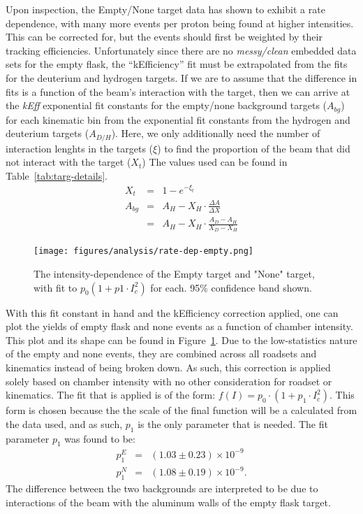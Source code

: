 Upon inspection, the Empty/None target data has shown to exhibit a rate dependence, with many more events per proton being found at higher intensities. This can be corrected for, but the events should first be weighted by their tracking efficiencies. Unfortunately since there are no \emph{messy/clean} embedded data sets for the empty flask, the ``kEfficiency'' fit must be extrapolated from the fits for the deuterium and hydrogen targets. If we are to assume that the difference in fits is a function of the beam's interaction with the target, then we can arrive at the \emph{kEff} exponential fit constants for the empty/none background targets ($A_{bg}$) for each kinematic bin from the exponential fit constants from the hydrogen and deuterium targets ($A_{D/H}$). Here, we only additionally need the number of interaction lenghts in the targets ($\xi$) to find the proportion of the beam that did not interact with the target ($X_t$) The values used can be found in Table~\ref{tab:targ-details}.
\begin{eqnarray}
X_t & = & 1 - e^{-\xi_t} \\
A_{bg} & = & A_H - X_H \cdot \frac{\Delta A}{\Delta X} \\
	   & = & A_H - X_H \cdot \frac{A_D - A_H}{X_D - X_H}
\end{eqnarray}

\begin{figure}
	\centering
	\texttt{[image: figures/analysis/rate-dep-empty.png]}
	\caption{The intensity-dependence of the Empty target and "None" target, with fit to $p_0 (1+p1\cdot I_c^2)$ for each. 95\% confidence band shown.}
	\label{fig:empty-rate-dep}
\end{figure}
With this fit constant in hand and the kEfficiency correction applied, one can plot the yields of empty flask and none events as a function of chamber intensity. This plot and its shape can be found in Figure~\ref{fig:empty-rate-dep}. Due to the low-statistics nature of the empty and none events, they are combined across all roadsets and kinematics instead of being broken down. As such, this correction is applied solely based on chamber intensity with no other consideration for roadset or kinematics. The fit that is applied is of the form: $f(I) = p_0 \cdot (1 + p_1 \cdot I_c^2)$. This form is chosen because the the scale of the final function will be a calculated from the data used, and as such, $p_1$ is the only parameter that is needed. The fit parameter $p_1$ was found to be:
\begin{eqnarray}
p^E_1 & = & (1.03 \pm 0.23) \times 10^{-9} \\
p^N_1 & = & (1.08 \pm 0.19) \times 10^{-9}.
\end{eqnarray}
The difference between the two backgrounds are interpreted to be due to interactions of the beam with the aluminum walls of the empty flask target.

